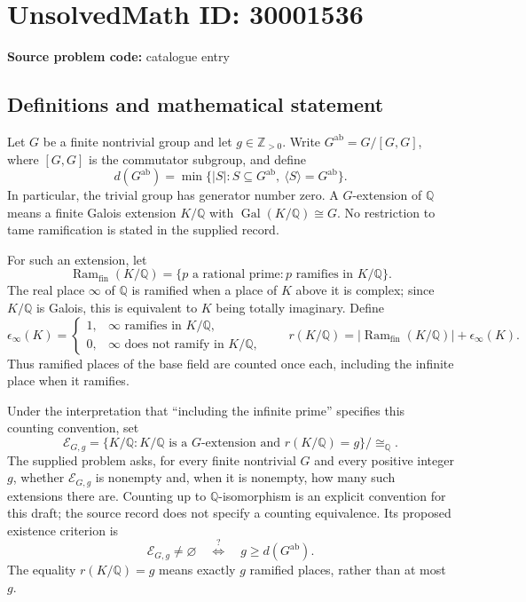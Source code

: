 \documentclass[11pt]{article}
\newcommand{\Z}{\mathbb{Z}}
\newcommand{\Q}{\mathbb{Q}}
\begin{document}
\section*{UnsolvedMath ID: 30001536}
\textbf{Source problem code:} catalogue entry
\subsection{Definitions and mathematical statement}
Let \(G\) be a finite nontrivial group and let \(g\in\Z_{>0}\). Write \(G^{\mathrm{ab}}=G/[G,G]\), where \([G,G]\) is the commutator subgroup, and define
\[
d(G^{\mathrm{ab}})=\min\{\lvert S\rvert:S\subseteq G^{\mathrm{ab}},\ \langle S\rangle=G^{\mathrm{ab}}\}.
\]
In particular, the trivial group has generator number zero. A \(G\)-extension of \(\Q\) means a finite Galois extension \(K/\Q\) with \(\operatorname{Gal}(K/\Q)\cong G\). No restriction to tame ramification is stated in the supplied record.

For such an extension, let
\[
\operatorname{Ram}_{\mathrm{fin}}(K/\Q)=\{p\text{ a rational prime}:p\text{ ramifies in }K/\Q\}.
\]
The real place \(\infty\) of \(\Q\) is ramified when a place of \(K\) above it is complex; since \(K/\Q\) is Galois, this is equivalent to \(K\) being totally imaginary. Define
\[
\epsilon_\infty(K)=\begin{cases}1,&\infty\text{ ramifies in }K/\Q,\\0,&\infty\text{ does not ramify in }K/\Q,\end{cases}
\qquad
r(K/\Q)=\lvert\operatorname{Ram}_{\mathrm{fin}}(K/\Q)\rvert+\epsilon_\infty(K).
\]
Thus ramified places of the base field are counted once each, including the infinite place when it ramifies.

Under the interpretation that ``including the infinite prime'' specifies this counting convention, set
\[
\mathcal E_{G,g}=\{K/\Q:K/\Q\text{ is a }G\text{-extension and }r(K/\Q)=g\}/\cong_{\Q}.
\]
The supplied problem asks, for every finite nontrivial \(G\) and every positive integer \(g\), whether \(\mathcal E_{G,g}\) is nonempty and, when it is nonempty, how many such extensions there are. Counting up to \(\Q\)-isomorphism is an explicit convention for this draft; the source record does not specify a counting equivalence. Its proposed existence criterion is
\[
\mathcal E_{G,g}\ne\varnothing
\quad\overset{?}{\Longleftrightarrow}\quad
g\ge d(G^{\mathrm{ab}}).
\]
The equality \(r(K/\Q)=g\) means exactly \(g\) ramified places, rather than at most \(g\).
\end{document}
